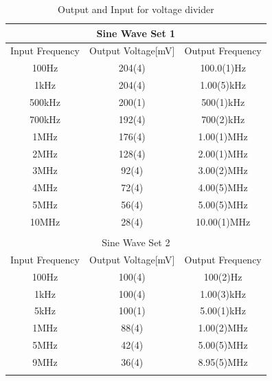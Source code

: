 \documentclass[aps,prl,reprint]{revtex4-1}
\begin{document}
    \begin{table}[h]
    \caption{Output and Input for voltage divider}
    \begin{ruledtabular}
    \begin{tabular}{ccc} 
    \multicolumn{3}{c}{Sine Wave Set 1} \\ \hline\hline
    Input Frequency & Output Voltage{[}mV{]} & Output Frequency \\ \hline\hline
    100Hz           & 204(4)                 & 100.0(1)Hz       \\ \hline
    1kHz            & 204(4)                 & 1.00(5)kHz       \\ \hline
    500kHz          & 200(1)                 & 500(1)kHz        \\ \hline
    700kHz          & 192(4)                 & 700(2)kHz        \\ \hline
    1MHz            & 176(4)                 & 1.00(1)MHz       \\ \hline
    2MHz            & 128(4)                 & 2.00(1)MHz       \\ \hline
    3MHz            & 92(4)                  & 3.00(2)MHz       \\ \hline
    4MHz            & 72(4)                  & 4.00(5)MHz       \\ \hline
    5MHz            & 56(4)                  & 5.00(5)MHz       \\ \hline
    10MHz           & 28(4)                  & 10.00(1)MHz      \\ \hline\hline
    \\
    \multicolumn{3}{c}{Sine Wave Set 2} \\ \hline\hline
    Input Frequency & Output Voltage{[}mV{]} & Output Frequency \\ \hline\hline
    100Hz           & 100(4)                 & 100(2)Hz         \\ \hline
    1kHz            & 100(4)                 & 1.00(3)kHz       \\ \hline
    5kHz            & 100(1)                 & 5.00(1)kHz       \\ \hline
    1MHz            & 88(4)                  & 1.00(2)MHz       \\ \hline
    5MHz            & 42(4)                  & 5.00(5)MHz       \\ \hline
    9MHz            & 36(4)                  & 8.95(5)MHz       \\ \hline\hline
    \\

\end{tabular}
\end{ruledtabular}
\end{table}
\end{document}
